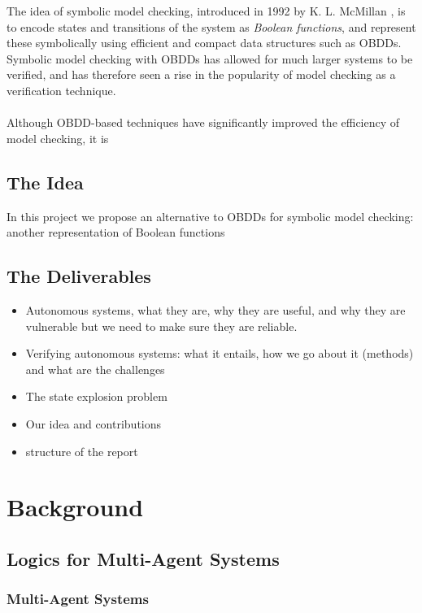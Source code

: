 \documentclass[11pt]{article}
\begin{document}
The idea of symbolic model checking, introduced in 1992 by K. L. McMillan \cite{symbolic}, is to encode states and transitions of the system as \textit{Boolean functions}, and represent these symbolically using efficient and compact data structures such as OBDDs. Symbolic model checking with OBDDs has allowed for much larger systems to be verified, and has therefore seen a rise in the popularity of model checking as a verification technique.
\\\\

Although OBDD-based techniques have significantly improved the efficiency of model checking, it is 



\subsection{The Idea}

In this project we propose an alternative to OBDDs for symbolic model checking: another representation of Boolean functions

\subsection{The Deliverables}


\begin{itemize}
\item Autonomous systems, what they are, why they are useful, and why they are vulnerable but we need to make sure they are reliable.
\item Verifying autonomous systems: what it entails, how we go about it (methods) and what are the challenges
\item The state explosion problem
\item Our idea and contributions
\item structure of the report
\end{itemize}

\section{Background}

\subsection{Logics for Multi-Agent Systems}

\subsubsection{Multi-Agent Systems}
\end{document}
